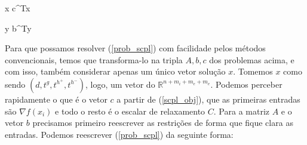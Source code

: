 \begin{mini!}
{x}{ c^Tx}{\label{prob_linear_pdr}}{}
\end{mini!}

\begin{maxi!}
{y}{ b^Ty}{}{}
\end{maxi!}

Para que possamos resolver (\ref{prob_scpl}) com facilidade pelos métodos convencionais,
temos que transforma-lo na tripla \(A, b, c\) dos problemas acima, e com isso, também
considerar apenas um único vetor solução \(x\). Tomemos \(x\) como sendo
\((d, t^g, t^{h^+}, t^{h^-})\), logo, um vetor do \(\mathbb{R}^{n + m_i + m_e + m_e}\).
Podemos perceber rapidamente o que é o vetor \(c\) a partir de (\ref{scpl_obj}),
que as primeiras entradas são \(\nabla f(x_i)\) e todo o resto é o escalar de
relaxamento \(C\). Para a matriz \(A\) e o vetor \(b\) precisamos primeiro
reescrever as restrições de forma que fique clara as entradas. Podemos reescrever
(\ref{prob_scpl}) da seguinte forma:

